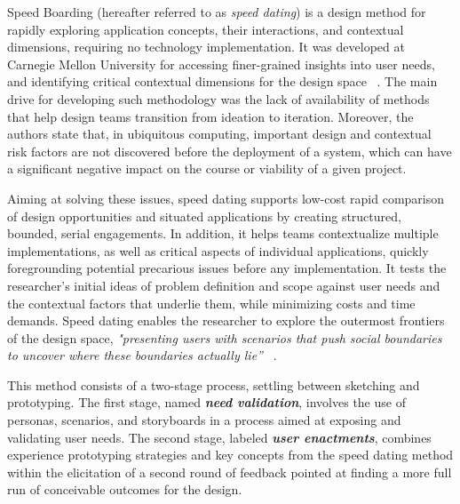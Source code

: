 \label{sec:speeddating}

Speed Boarding (hereafter referred to as \textit{speed dating}) is a design method for rapidly exploring application concepts, their interactions, and contextual dimensions, requiring no technology implementation. It was developed at Carnegie Mellon University for accessing finer-grained insights into user needs, and identifying critical contextual dimensions for the design space ~\cite{Davidoff2007}. The main drive for developing such methodology was the lack of availability of methods that help design teams transition from ideation to iteration. Moreover, the authors state that, in ubiquitous computing, important design and contextual risk factors are not discovered before the deployment of a system, which can have a significant negative impact on the course or viability of a given project.

Aiming at solving these issues, speed dating supports low-cost rapid comparison of design opportunities and situated applications by creating structured, bounded, serial engagements. In addition, it helps teams contextualize multiple implementations, as well as critical aspects of individual applications, quickly foregrounding potential precarious issues before any implementation. It tests the researcher's initial ideas of problem definition and scope against user needs and the contextual factors that underlie them, while minimizing costs and time demands. Speed dating enables the researcher to explore the outermost frontiers of the design space, \textit{"presenting users with scenarios that push social boundaries to uncover where these boundaries actually lie”} ~\cite{Davidoff2007}.

This method consists of a two-stage process, settling between sketching and prototyping. The first stage, named \textbf{\textit{need validation}}, involves the use of personas, scenarios, and storyboards in a process aimed at exposing and validating user needs. The second stage, labeled \textbf{\textit{user enactments}}, combines experience prototyping strategies and key concepts from the speed dating method within the elicitation of a second round of feedback pointed at finding a more full run of conceivable outcomes for the design.


